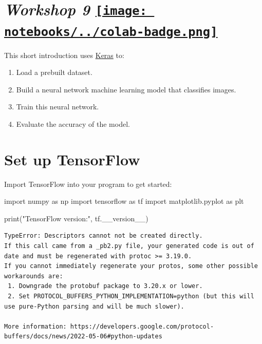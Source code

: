 \documentclass[
  letterpaper,
  DIV=11,
  numbers=noendperiod]{scrreprt}
\newenvironment{Shaded}{\begin{snugshade}}{\end{snugshade}}
\newcommand{\BuiltInTok}[1]{\textcolor[rgb]{0.00,0.23,0.31}{#1}}
\newcommand{\ImportTok}[1]{\textcolor[rgb]{0.00,0.46,0.62}{#1}}
\newcommand{\NormalTok}[1]{\textcolor[rgb]{0.00,0.23,0.31}{#1}}
\newcommand{\StringTok}[1]{\textcolor[rgb]{0.13,0.47,0.30}{#1}}
\providecommand{\tightlist}{%
  \setlength{\itemsep}{0pt}\setlength{\parskip}{0pt}}\usepackage{longtable,booktabs,array}
\begin{document}
\hypertarget{workshop-9-open-in-colab}{%
\section[\emph{Workshop 9} ]{\texorpdfstring{\emph{Workshop 9}
\href{https://colab.research.google.com/github/oballinger/QM2/blob/main/notebooks/W09.\%20Machine\%20Learning.ipynb}{\protect\texttt{[image: notebooks/../colab-badge.png]}}}{Workshop 9 Open In Colab}}\label{workshop-9-open-in-colab}}

This short introduction uses
\href{https://www.tensorflow.org/guide/keras/overview}{Keras} to:

\begin{enumerate}
\def\labelenumi{\arabic{enumi}.}
\tightlist
\item
  Load a prebuilt dataset.
\item
  Build a neural network machine learning model that classifies images.
\item
  Train this neural network.
\item
  Evaluate the accuracy of the model.
\end{enumerate}

\hypertarget{set-up-tensorflow}{%
\section{Set up TensorFlow}\label{set-up-tensorflow}}

Import TensorFlow into your program to get started:

\begin{Shaded}
\begin{Highlighting}[]
\ImportTok{import}\NormalTok{ numpy }\ImportTok{as}\NormalTok{ np}
\ImportTok{import}\NormalTok{ tensorflow }\ImportTok{as}\NormalTok{ tf}
\ImportTok{import}\NormalTok{ matplotlib.pyplot }\ImportTok{as}\NormalTok{ plt}

\BuiltInTok{print}\NormalTok{(}\StringTok{"TensorFlow version:"}\NormalTok{, tf.\_\_version\_\_)}
\end{Highlighting}
\end{Shaded}

\begin{verbatim}
TypeError: Descriptors cannot not be created directly.
If this call came from a _pb2.py file, your generated code is out of date and must be regenerated with protoc >= 3.19.0.
If you cannot immediately regenerate your protos, some other possible workarounds are:
 1. Downgrade the protobuf package to 3.20.x or lower.
 2. Set PROTOCOL_BUFFERS_PYTHON_IMPLEMENTATION=python (but this will use pure-Python parsing and will be much slower).

More information: https://developers.google.com/protocol-buffers/docs/news/2022-05-06#python-updates
\end{verbatim}
\end{document}
